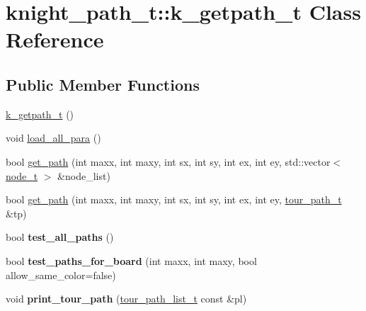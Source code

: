 \hypertarget{classknight__path__t_1_1k__getpath__t}{\section{knight\-\_\-path\-\_\-t\-:\-:k\-\_\-getpath\-\_\-t \-Class \-Reference}
\label{classknight__path__t_1_1k__getpath__t}
}
\subsection*{\-Public \-Member \-Functions}
\begin{DoxyCompactItemize}
\item 
\hyperlink{classknight__path__t_1_1k__getpath__t_a26486e63b83972a775a2a7de222d7728}{k\-\_\-getpath\-\_\-t} ()
\item 
void \hyperlink{classknight__path__t_1_1k__getpath__t_a79d58451308ea02d2145880569492823}{load\-\_\-all\-\_\-para} ()
\item 
bool \hyperlink{classknight__path__t_1_1k__getpath__t_ad8fa968e1f9e37e437cf6d17a4565156}{get\-\_\-path} (int maxx, int maxy, int sx, int sy, int ex, int ey, std\-::vector$<$ \hyperlink{structknight__path__t_1_1node__t}{node\-\_\-t} $>$ \&node\-\_\-list)
\item 
bool \hyperlink{classknight__path__t_1_1k__getpath__t_a30ab610afec6be8daf3a429a7b04b45f}{get\-\_\-path} (int maxx, int maxy, int sx, int sy, int ex, int ey, \hyperlink{structknight__path__t_1_1tour__path__t}{tour\-\_\-path\-\_\-t} \&tp)
\item 
\hypertarget{classknight__path__t_1_1k__getpath__t_ac7ff8402fa242ffa7b8ff9a240dd63d9}{bool {\bfseries test\-\_\-all\-\_\-paths} ()}\label{classknight__path__t_1_1k__getpath__t_ac7ff8402fa242ffa7b8ff9a240dd63d9}

\item 
\hypertarget{classknight__path__t_1_1k__getpath__t_acc0dd4021350e10e07cb7d5086e72bfb}{bool {\bfseries test\-\_\-paths\-\_\-for\-\_\-board} (int maxx, int maxy, bool allow\-\_\-same\-\_\-color=false)}\label{classknight__path__t_1_1k__getpath__t_acc0dd4021350e10e07cb7d5086e72bfb}

\item 
\hypertarget{classknight__path__t_1_1k__getpath__t_a539cfd28369ede5d708f8121ac6aef0e}{void {\bfseries print\-\_\-tour\-\_\-path} (\hyperlink{namespaceknight__path__t_a9e0a15a5d1f3d40a7ad5fe101905764a}{tour\-\_\-path\-\_\-list\-\_\-t} const \&pl)}\label{classknight__path__t_1_1k__getpath__t_a539cfd28369ede5d708f8121ac6aef0e}

\end{DoxyCompactItemize}


